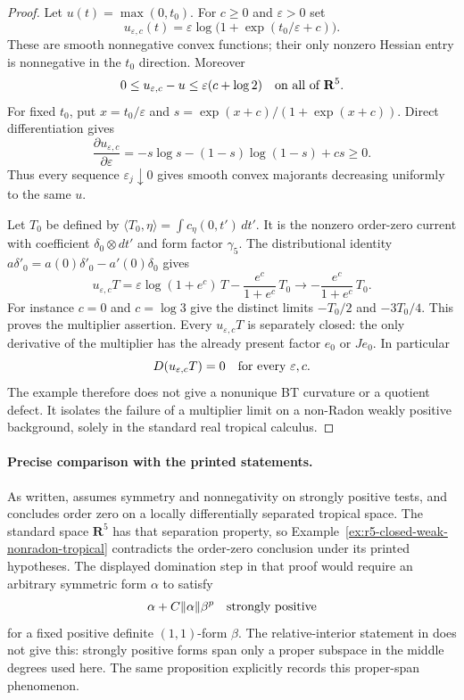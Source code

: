 \documentclass[11pt,a4paper]{article}
\numberwithin{equation}{section}
\theoremstyle{definition}
\theoremstyle{remark}
\begin{document}
\begin{proof}
Let $u(t)=\max(0,t_0)$.  For $c\ge0$ and $\varepsilon>0$ set
\[
 u_{\varepsilon,c}(t)
       =\varepsilon\log\bigl(1+\exp(t_0/\varepsilon+c)\bigr).
\]
These are smooth nonnegative convex functions; their only
nonzero Hessian entry is nonnegative in the $t_0$ direction.
Moreover
\[
    0\le u_{\varepsilon,c}-u\le\varepsilon(c+\log2)
                    \quad\hbox{on all of }\mathbf R^5.
\]
For fixed $t_0$, put $x=t_0/\varepsilon$ and
$s=\exp(x+c)/(1+\exp(x+c))$.  Direct differentiation gives
\[
 \frac{\partial u_{\varepsilon,c}}{\partial\varepsilon}
  =-s\log s-(1-s)\log(1-s)+cs\ge0.
\]
Thus every sequence $\varepsilon_j\downarrow0$ gives smooth
convex majorants decreasing uniformly to the same $u$.

Let $T_0$ be defined by
$\langle T_0,\eta\rangle=\int c_\eta(0,t')\,dt'$.
It is the nonzero order-zero current with coefficient
$\delta_0\otimes dt'$ and form factor $\gamma_5$.
The distributional identity
$a\delta'_0=a(0)\delta'_0-a'(0)\delta_0$ gives
\[
 u_{\varepsilon,c}T
  =\varepsilon\log(1+e^c)\,T
                  -\frac{e^c}{1+e^c}\,T_0
  \longrightarrow -\frac{e^c}{1+e^c}\,T_0.
\]
For instance $c=0$ and $c=\log3$ give the distinct limits
$-T_0/2$ and $-3T_0/4$.  This proves the multiplier assertion.
Every $u_{\varepsilon,c}T$ is separately closed: the only
derivative of the multiplier has the already present factor
$e_0$ or $Je_0$.  In particular
\[
                         D(u_{\varepsilon,c}T)=0
                         \quad\hbox{for every }\varepsilon,c.
\]
The example therefore does not give a nonunique BT curvature or
a quotient defect.  It isolates the failure of a multiplier
limit on a non-Radon weakly positive background, solely in the
standard real tropical calculus.
\end{proof}

\paragraph{Precise comparison with the printed statements.}
As written, \cite[Proposition 7.2.9, p.~162]{CLD25} assumes
symmetry and nonnegativity on strongly positive tests, and
concludes order zero on a locally differentially separated
tropical space.  The standard space $\mathbf R^5$ has that
separation property, so Example~\ref{ex:r5-closed-weak-nonradon-tropical}
contradicts the order-zero conclusion under its printed
hypotheses.  The displayed domination step in that proof would
require an arbitrary symmetric form $\alpha$ to satisfy
\[
             \alpha+C\|\alpha\|\beta^p
                          \quad\hbox{strongly positive}
\]
for a fixed positive definite $(1,1)$-form $\beta$.
The relative-interior statement in
\cite[Proposition 1.2.13, pp.~27--28]{CLD25} does not give this:
strongly positive forms span only a proper subspace in the
middle degrees used here.  The same proposition explicitly
records this proper-span phenomenon.
\end{document}
